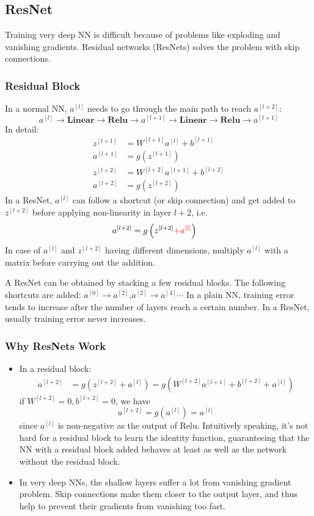 \subsection{ResNet}
Training very deep NN is difficult because of problems like exploding and vanishing gradients. Residual networks (ResNets) solves the problem with skip connections.
\subsubsection{Residual Block}
In a normal NN, $a^{[l]}$ needs to go through the main path to reach $a^{[l+2]}$:
\[a^{[l]}\rightarrow\textbf{Linear}\rightarrow\textbf{Relu}\rightarrow a^{[l+1]}\rightarrow\textbf{Linear}\rightarrow\textbf{Relu}\rightarrow a^{[l+1]}\]
In detail: 
\begin{align*}
  z^{[l+1]}&=W^{[l+1]}a^{[l]}+b^{[l+1]}\\
  a^{[l+1]}&=g\left(z^{[l+1]}\right)\\
  z^{[l+2]}&=W^{[l+2]}a^{[l+1]}+b^{[l+2]}\\
  a^{[l+2]}&=g\left(z^{[l+2]}\right)
\end{align*}
In a ResNet, $a^{[l]}$ can follow a shortcut (or skip connection) and get added to $z^{[l+2]}$ before applying non-linearity in layer $l+2$, i.e.
\begin{align*}
  a^{[l+2]}&=g\left(z^{[l+2]}{\color{red}+a^{[l]}}\right)
\end{align*}
In case of $a^{[l]}$ and $z^{[l+2]}$ having different dimensions, multiply $a^{[l]}$ with a matrix before carrying out the addition.

A ResNet can be obtained by stacking a few residual blocks. The following shortcuts are added: $a^{[0]}\rightarrow a^{[2]}$,$a^{[2]}\rightarrow a^{[4]}\cdots$
In a plain NN, training error tends to increase after the number of layers reach a certain number. In a ResNet, usually training error never increases.
\subsubsection{Why ResNets Work}
\begin{itemize}
\item In a residual block: 
\begin{align*}
  a^{[l+2]}&=g\left(z^{[l+2]}+a^{[l]}\right)=g\left(W^{[l+2]}a^{[l+1]}+b^{[l+2]}+a^{[l]}\right)
\end{align*}
if $W^{[l+2]}=0,b^{[l+2]}=0$, we have
\[a^{[l+2]}=g\left(a^{[l]}\right)=a^{[l]}\]
since $a^{[l]}$ is non-negative as the output of Relu. Intuitively speaking, it's not hard for a residual block to learn the identity function, guaranteeing that the NN with a residual block added behaves at least as well as the network without the residual block.
\item In very deep NNs, the shallow layers suffer a lot from vanishing gradient problem. Skip connections make them closer to the output layer, and thus help to prevent their gradients from vanishing too fast. 
\end{itemize}
